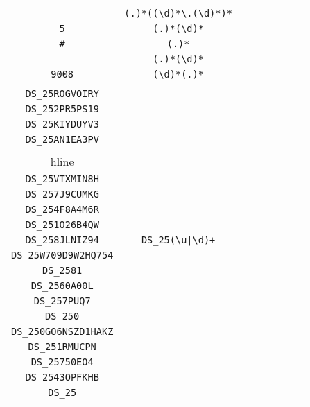 \begin{longtable}{cccccccc}
\begin{tabular}{ll}
    \verb|| & \verb|(.)*((\d)*\.(\d)*)*|\\
\verb|5| & \verb|(.)*(\d)*|\\
\verb|#| & \verb|(.)*|\\
\verb|| & \verb|(.)*(\d)*|\\
\verb|9008| & \verb|(\d)*(.)*|
\end{tabular}
\\\midrule 
\begin{tabular}{l}
    \verb|DS_258KADVNLH|\\
\verb|DS_25ROGVOIRY|\\
\verb|DS_252PR5PS19|\\
\verb|DS_25KIYDUYV3|\\
\verb|DS_25AN1EA3PV|\\
\\hline\\
\verb|DS_25VTXMIN8H|\\
\verb|DS_257J9CUMKG|\\
\verb|DS_254F8A4M6R|\\
\verb|DS_251O26B4QW|\\
\verb|DS_258JLNIZ94|
\end{tabular}

&
\verb.DS_25(\u|\d)+.
&

\begin{tabular}{l}
    \verb|DS_25((\d)*\u)*(\u)*(\d)*|\\
\verb|DS_25W709D9W2HQ754|\\
\verb|DS_2581|\\
\verb|DS_2560A00L|\\
\verb|DS_257PUQ7|\\
\verb|DS_250|
\end{tabular}

&

\begin{tabular}{l}
    \verb.DS_25((\d)*\u\u)*((\u)*(\d)*)|.\\
\verb|DS_250GO6NSZD1HAKZ|\\
\verb|DS_251RMUCPN|\\
\verb|DS_25750EO4|\\
\verb|DS_2543OPFKHB|\\
\verb|DS_25|
\end{tabular}

&


\end{longtable}

